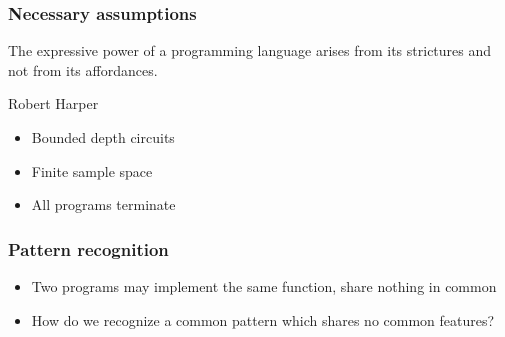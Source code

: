 \documentclass{beamer}
\begin{document}
    \begin{frame}
        \frametitle{Necessary assumptions}
        \setlength{\epigraphwidth}{0.5\textwidth}
        \epigraph{The expressive power of a programming language arises from its strictures and not from its affordances.}{Robert Harper}
        \begin{itemize}
            \item Bounded depth circuits
            \item Finite sample space
            \item All programs terminate
        \end{itemize}
    \end{frame}

    \begin{frame}
        \frametitle{Pattern recognition}
        \begin{itemize}
            \item Two programs may implement the same function, share nothing in common
            \item How do we recognize a common pattern which shares no common features?
        \end{itemize}
    \end{frame}
\end{document}
